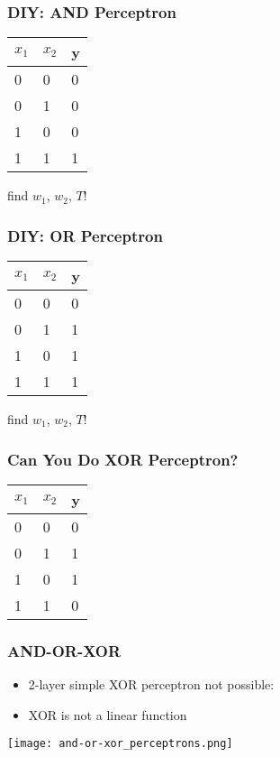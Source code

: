 \documentclass[mathserif]{beamer}
\begin{document}
\begin{frame}
  \frametitle{DIY: AND Perceptron}
  \begin{center}
    \begin{tabular}{lll}
      \toprule
      $x_{1}$ & $x_{2}$ & y \\
      \midrule
      0 & 0 & 0 \\
      0 & 1 & 0 \\
      1 & 0 & 0 \\
      1 & 1 & 1 \\
      \bottomrule
    \end{tabular}
  \end{center}
  find $w_{1}$, $w_{2}$, $T$!
\end{frame}

\begin{frame}
  \frametitle{DIY: OR Perceptron}
  \begin{center}
    \begin{tabular}{lll}
      \toprule
      $x_{1}$ & $x_{2}$ & y \\
      \midrule
      0 & 0 & 0 \\
      0 & 1 & 1 \\
      1 & 0 & 1 \\
      1 & 1 & 1 \\
      \bottomrule
    \end{tabular}
  \end{center}
  find $w_{1}$, $w_{2}$, $T$!
\end{frame}


\begin{frame}
  \frametitle{Can You Do XOR Perceptron?}
  \begin{center}
    \begin{tabular}{lll}
      \toprule
      $x_{1}$ & $x_{2}$ & y \\
      \midrule
      0 & 0 & 0 \\
      0 & 1 & 1 \\
      1 & 0 & 1 \\
      1 & 1 & 0 \\
      \bottomrule
    \end{tabular}
  \end{center}
\end{frame}

\begin{frame}
  \frametitle{AND-OR-XOR}
  \begin{itemize}
  \item 2-layer simple XOR perceptron not possible:
  \item XOR is not a linear function
  \end{itemize}
  \begin{center}
    \texttt{[image: and-or-xor\_perceptrons.png]}
  \end{center}
\end{frame}
\end{document}
